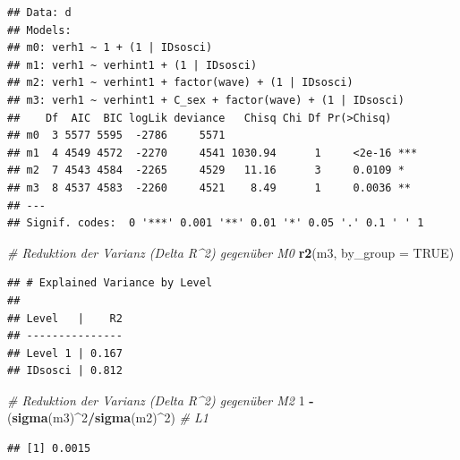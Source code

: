 \documentclass[
]{book}
\newenvironment{Shaded}{\begin{snugshade}}{\end{snugshade}}
\newcommand{\CommentTok}[1]{\textcolor[rgb]{0.56,0.35,0.01}{\textit{#1}}}
\newcommand{\DataTypeTok}[1]{\textcolor[rgb]{0.13,0.29,0.53}{#1}}
\newcommand{\DecValTok}[1]{\textcolor[rgb]{0.00,0.00,0.81}{#1}}
\newcommand{\KeywordTok}[1]{\textcolor[rgb]{0.13,0.29,0.53}{\textbf{#1}}}
\newcommand{\NormalTok}[1]{#1}
\newcommand{\OperatorTok}[1]{\textcolor[rgb]{0.81,0.36,0.00}{\textbf{#1}}}
\newcommand{\OtherTok}[1]{\textcolor[rgb]{0.56,0.35,0.01}{#1}}
\newcommand{\StringTok}[1]{\textcolor[rgb]{0.31,0.60,0.02}{#1}}
\begin{document}
\begin{verbatim}
## Data: d
## Models:
## m0: verh1 ~ 1 + (1 | IDsosci)
## m1: verh1 ~ verhint1 + (1 | IDsosci)
## m2: verh1 ~ verhint1 + factor(wave) + (1 | IDsosci)
## m3: verh1 ~ verhint1 + C_sex + factor(wave) + (1 | IDsosci)
##    Df  AIC  BIC logLik deviance   Chisq Chi Df Pr(>Chisq)    
## m0  3 5577 5595  -2786     5571                              
## m1  4 4549 4572  -2270     4541 1030.94      1     <2e-16 ***
## m2  7 4543 4584  -2265     4529   11.16      3     0.0109 *  
## m3  8 4537 4583  -2260     4521    8.49      1     0.0036 ** 
## ---
## Signif. codes:  0 '***' 0.001 '**' 0.01 '*' 0.05 '.' 0.1 ' ' 1
\end{verbatim}

\begin{Shaded}
\begin{Highlighting}[]
\CommentTok{# Reduktion der Varianz (Delta R^2) gegenüber M0}
\KeywordTok{r2}\NormalTok{(m3, }\DataTypeTok{by_group =} \OtherTok{TRUE}\NormalTok{)}
\end{Highlighting}
\end{Shaded}

\begin{verbatim}
## # Explained Variance by Level
## 
## Level   |    R2
## ---------------
## Level 1 | 0.167
## IDsosci | 0.812
\end{verbatim}

\begin{Shaded}
\begin{Highlighting}[]
\CommentTok{# Reduktion der Varianz (Delta R^2) gegenüber M2}
\DecValTok{1} \OperatorTok{-}\StringTok{ }\NormalTok{(}\KeywordTok{sigma}\NormalTok{(m3)}\OperatorTok{^}\DecValTok{2}\OperatorTok{/}\KeywordTok{sigma}\NormalTok{(m2)}\OperatorTok{^}\DecValTok{2}\NormalTok{)  }\CommentTok{# L1}
\end{Highlighting}
\end{Shaded}

\begin{verbatim}
## [1] 0.0015
\end{verbatim}

\begin{Shaded}
\end{Shaded}
\end{document}
